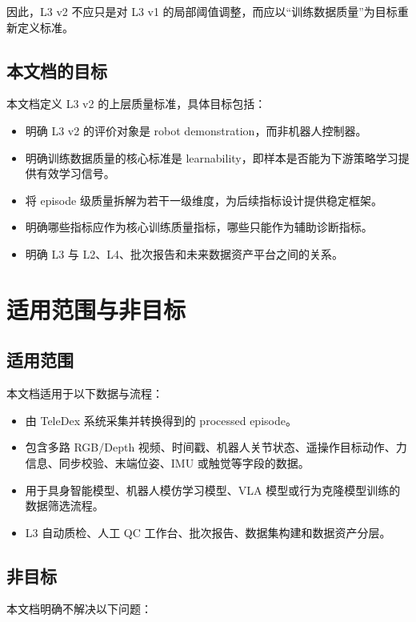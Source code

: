 \documentclass[UTF8,zihao=-4,oneside,openany]{ctexrep}
\begin{document}
因此，L3 v2 不应只是对 L3 v1 的局部阈值调整，而应以“训练数据质量”为目标重新定义标准。

\subsection{本文档的目标}

本文档定义 L3 v2 的上层质量标准，具体目标包括：

\begin{itemize}
  \item 明确 L3 v2 的评价对象是 robot demonstration，而非机器人控制器。
  \item 明确训练数据质量的核心标准是 learnability，即样本是否能为下游策略学习提供有效学习信号。
  \item 将 episode 级质量拆解为若干一级维度，为后续指标设计提供稳定框架。
  \item 明确哪些指标应作为核心训练质量指标，哪些只能作为辅助诊断指标。
  \item 明确 L3 与 L2、L4、批次报告和未来数据资产平台之间的关系。
\end{itemize}

\section{适用范围与非目标}

\subsection{适用范围}

本文档适用于以下数据与流程：

\begin{itemize}
  \item 由 TeleDex 系统采集并转换得到的 processed episode。
  \item 包含多路 RGB/Depth 视频、时间戳、机器人关节状态、遥操作目标动作、力信息、同步校验、末端位姿、IMU 或触觉等字段的数据。
  \item 用于具身智能模型、机器人模仿学习模型、VLA 模型或行为克隆模型训练的数据筛选流程。
  \item L3 自动质检、人工 QC 工作台、批次报告、数据集构建和数据资产分层。
\end{itemize}

\subsection{非目标}

本文档明确不解决以下问题：
\end{document}
